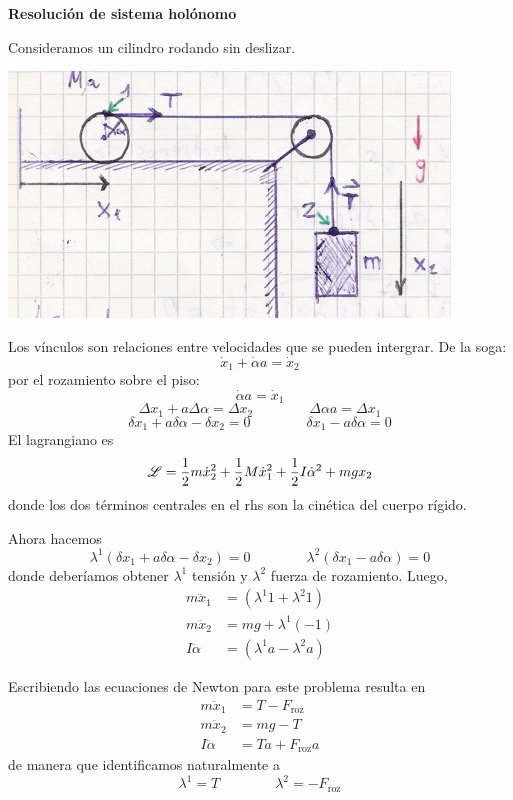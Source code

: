 \documentclass[10pt,oneside]{CBFT_book}
\begin{document}
\begin{ejemplo}{\bf Resolución de sistema holónomo}

Consideramos un cilindro rodando sin deslizar.

\includegraphics[scale=0.3]{images/fig_mc_cilindro_and_peso.jpg}

Los vínculos son relaciones entre velocidades que se pueden intergrar.
De la soga:
\[
	\dot{x}_1 + \dot{\alpha} a = \dot{x}_2
\]
por el rozamiento sobre el piso:
\[
	\dot{\alpha} a = \dot{x}_1
\]
\[
	\Delta x_1 + a \Delta \alpha = \Delta x_2
	\qquad \qquad 
	\Delta \alpha a = \Delta x_1
\]
\[
	\delta x_1 + a \delta \alpha - \delta x_2 = 0
	\qquad \qquad \delta x_1 - a \delta \alpha = 0 
\]
El lagrangiano es
\[
	\mathscr{L} = \frac{1}{2} m \dot{x}_2^2 + \frac{1}{2}M\dot{x}_1^2 + \frac{1}{2}I\dot{\alpha}^2 + mgx_2
\]
donde los dos términos centrales en el rhs son la cinética del cuerpo rígido.

Ahora hacemos 
\[
	\lambda^1 ( \delta x_1 + a \delta \alpha - \delta x_2 ) = 0 \qquad \qquad 
	\lambda^2 ( \delta x_1 - a \delta \alpha ) = 0
\]
donde deberíamos obtener $ \lambda^1 $ tensión y $ \lambda^2 $ fuerza de rozamiento.
Luego,
\begin{eqnarray*}
	m\ddot{x}_1 & = (\lambda^1 1 + \lambda^2 1) \\
	m\ddot{x}_2 & = mg + \lambda^1(-1) \\
	I\ddot{\alpha} & = (\lambda^1 a - \lambda^2 a)
\end{eqnarray*}

Escribiendo las ecuaciones de Newton para este problema resulta en
\begin{eqnarray*}
	m\ddot{x}_1 & = T - F_{\text{roz}} \\
	m\ddot{x}_2 & = mg - T \\
	I\ddot{\alpha} & = T a + F_{\text{roz}} a 
\end{eqnarray*}
de manera que identificamos naturalmente a 
\[
	\lambda^1 = T \qquad \qquad \lambda^2 = - F_{\text{roz}}
\]
\end{ejemplo}
\end{document}
